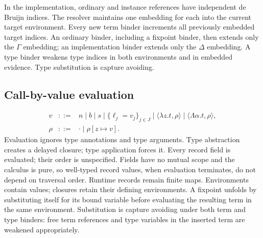 \documentclass[10pt,a4paper]{article}
\begin{document}
In the implementation, ordinary and instance references have independent de Bruijn indices.
The resolver maintains one embedding for each into the current target environment.
Every new term binder increments all previously embedded target indices. An ordinary
binder, including a fixpoint binder, then extends only the $\Gamma$ embedding; an implementation binder extends only
the $\Delta$ embedding. A type binder weakens type indices in both environments and
in embedded evidence. Type substitution is capture avoiding.

\newpage
\subsection{Call-by-value evaluation}
\label{sec:evaluation}
\[
\begin{array}{rcl}
v&::=& n\mid b\mid s\mid\{\ell_j=v_j\}_{j\in J}\mid
 \langle\lambda z.t,\rho\rangle\mid\langle\Lambda\alpha.t,\rho\rangle,\\
\rho&::=&\cdot\mid\rho[z\mapsto v].
\end{array}
\]
Evaluation ignores type annotations and type arguments. Type abstraction creates a delayed
closure; type application forces it. Every record field is evaluated; their order is
unspecified. Fields have no mutual scope and the calculus is pure, so well-typed record
values, when evaluation terminates, do not depend on traversal order. Runtime records remain finite maps.
Environments contain values; closures retain their defining environments. A fixpoint
unfolds by substituting itself for its bound variable before evaluating the resulting term
in the same environment. Substitution is capture avoiding under both term and type binders:
free term references and type variables in the inserted term are weakened appropriately.
\end{document}
